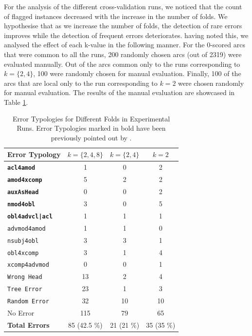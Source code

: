 For the analysis of the different cross-validation runs, we noticed that the count of flagged instances decreased with the increase in the number of folds. We hypothesise that as we increase the number of folds, the detection of rare errors improves while the detection of frequent errors deteriorates. having noted this, we analysed the effect of each k-value in the following manner. For the 0-scored arcs that were common to all the runs, 200 randomly chosen arcs (out of 2319) were evaluated manually. Out of the arcs common only to the runs corresponding to \(k= \{2, 4\}\), 100 were randomly chosen for manual evaluation. Finally, 100 of the arcs that are local only to the run corresponding to \(k=2\) were chosen randomly for manual evaluation. The results of the manual evaluation are showcased in Table \ref{tab:liscatypology}.

\begin{table}[H]
    \centering
    \begin{tabular}{|l|c|c|c|}
        \hline
        \textbf{Error Typology} & \textbf{\(k = \{2, 4, 8\}\)} & \textbf{\(k= \{2, 4\}\)} & \textbf{\(k=2\)} \\
        \hline
        \hline
        \textbf{\texttt{acl4amod}} & 1 & 0 & 2 \\
        \textbf{\texttt{amod4xcomp}} & 5 & 2 & 2 \\
        \textbf{\texttt{auxAsHead}} & 0 & 0 & 2 \\
        \textbf{\texttt{nmod4obl}} & 3 & 0 & 5 \\
        \textbf{\texttt{obl4advcl|acl}} & 1 & 1 & 1 \\
        \texttt{advmod4amod} & 1 & 1 & 0 \\
        \texttt{nsubj4obl} & 3 & 3 & 1 \\
        \texttt{obl4xcomp} & 3 & 1 & 4 \\
        \texttt{xcomp4advmod} & 0 & 0 & 1 \\
        \texttt{Wrong Head} & 13 & 2 & 4 \\
        \texttt{Tree Error} & 23 & 1 & 3 \\
        \texttt{Random Error} & 32 & 10 & 10 \\
        No Error & 115 & 79 & 65 \\
        \hline
        \hline
        \textbf{Total Errors} & 85 (42.5 \%) & 21 (21 \%) & 35 (35 \%) \\
        \hline
    \end{tabular}
    \caption[Error Typologies for Different Folds in Experimental Runs]{Error Typologies for Different Folds in Experimental Runs. Error Typologies marked in bold have been previously pointed out by \cite{alzetta2017dangerous}.}
    \label{tab:liscatypology}
\end{table}

